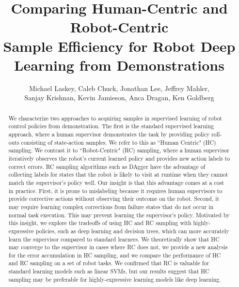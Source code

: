 \documentclass[10pt, conference]{ieeeconf}      %
\title{Comparing Human-Centric and Robot-Centric \\
Sample Efficiency for Robot Deep Learning from Demonstrations}
\author{Michael Laskey, Caleb Chuck, Jonathan Lee, Jeffrey Mahler,\\ Sanjay Krishnan, Kevin Jamieson, Anca Dragan, Ken Goldberg}
\begin{document}
\maketitle
\thispagestyle{empty}
\pagestyle{empty}







\begin{abstract}
We characterize two approaches to acquiring samples in supervised learning of robot control policies from demonstration. The first is the standard supervised learning approach, where a human supervisor demonstrates the task by providing policy roll-outs consisting of state-action samples. We refer to this as ``Human Centric" (HC) sampling. We contrast it to ``Robot-Centric" (RC) sampling, where a human supervisor iteratively observes the robot's current learned policy and provides new action labels to correct errors.  
RC sampling algorithms such as DAgger have the advantage of collecting labels for states that the robot is likely to visit at runtime when they cannot match the supervisor's policy well.
Our insight is that this advantage comes at a cost in practice. First, it is prone to mislabeling because it requires human supervisors to provide corrective actions without observing their outcome on the robot. Second, it may require learning complex corrections from failure states that do not occur in normal task execution. This may prevent learning the supervisor's policy.  Motivated by this insight, we explore the tradeoffs of using HC and RC sampling with highly-expressive policies, such as deep learning and decision trees, which can more accurately learn the supervisor compared to standard learners.
We theoretically show that HC may converge to the supervisor in cases where RC does not, we provide a new analysis for the error accumulation in HC sampling, and we compare the performance of HC and RC sampling on a set of robot tasks. 
We confirmed that RC is valuable for standard learning models such as linear SVMs, but our results suggest that HC sampling may be preferable for highly-expressive learning models like deep learning.
 \end{abstract}
\end{document}
